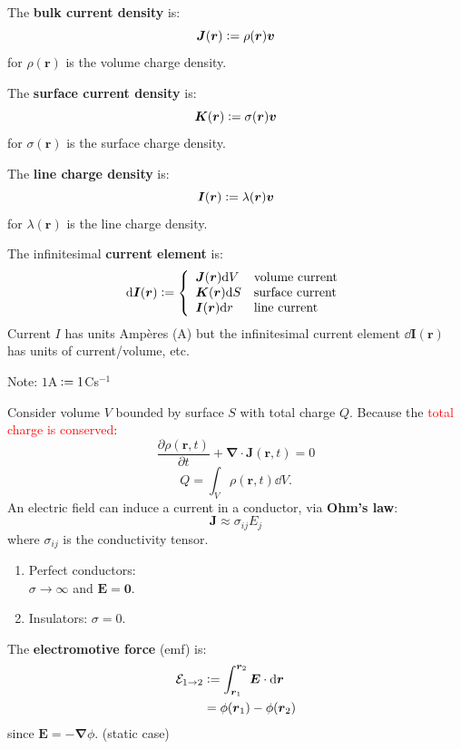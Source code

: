 \documentclass{article}
\newcommand{\deq}{\vcentcolon=}
\newcommand{\vc}[1]{\boldsymbol{#1}}
\begin{document}
\begin{multicols*}{3}
The \textbf{bulk current density} is:
$$\vc{J}(\vc{r})\deq\rho(\vc{r})\vc{v}$$
for $\rho(\vc{r})$ is the volume charge density.

The \textbf{surface current density} is:
$$\vc{K}(\vc{r})\deq\sigma(\vc{r})\vc{v}$$
for $\sigma(\vc{r})$ is the surface charge density.

The \textbf{line charge density} is:
$$\vc{I}(\vc{r})\deq\lambda(\vc{r})\vc{v}$$
for $\lambda(\vc{r})$ is the line charge density.

The infinitesimal \textbf{current element} is:
$$\dd\vc{I}(\vc{r})\deq\left\{\begin{array}{lll}
    \vc{J}(\vc{r})\dd V & \text{volume current} \\
    \vc{K}(\vc{r})\dd S & \text{surface current} \\
    \vc{I}(\vc{r})\dd r & \text{line current}
\end{array}\right.$$
Current $I$ has units Amp\`eres (A)
but the infinitesimal current element $\dd\vc{I}(\vc{r})$
has units of current/volume, etc.

Note: $1$A$\hspace{0.03in}\deq1$Cs$^{-1}$

Consider volume $V$ bounded by surface $S$
with total charge $Q$.
Because the \textcolor{red}{total charge is conserved}:
$$\frac{\partial \rho(\vc{r},t)}{\partial t}
+\vc{\nabla}\cdot\vc{J}(\vc{r},t)=0$$
$$Q=\int_V\rho(\vc{r},t)\dd V.$$
An electric field can induce a current in a conductor,
via \textbf{Ohm's law}:
$$\vc{J}\approx\sigma_{ij}E_j$$
where $\sigma_{ij}$ is the conductivity tensor.
\begin{enumerate}
    \item Perfect conductors: \\
    $\sigma\rightarrow\infty$
    and $\vc{E}=\vc{0}$.

    \item Insulators: $\sigma=0$.
\end{enumerate}
The \textbf{electromotive force} (emf) is:
\begin{align*}
    \mathcal{E}_{1\rightarrow2}
    &\deq\int_{\vc{r}_1}^{\vc{r}_2}\vc{E}\cdot\dd\vc{r} \\
    &=\phi(\vc{r}_1)-\phi(\vc{r}_2)
\end{align*}
since $\vc{E}=-\vc{\nabla}\phi$. (static case)


\end{multicols*}
\end{document}
